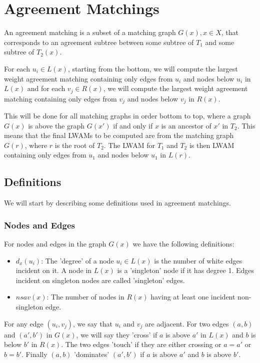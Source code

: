 \section{Agreement Matchings}
\label{agreementMatchingSection}
An agreement matching is a subset of a matching graph $G(x), x \in X$, that corresponds to an agreement subtree between some subtree of $T_1$ and some subtree of $T_2(x)$.

For each $u_i \in L(x)$, starting from the bottom, we will compute the largest weight agreement matching containing only edges from $u_i$ and nodes below $u_i$ in $L(x)$ and for each $v_j \in R(x)$, we will compute the largest weight agreement matching containing only edges from $v_j$ and nodes below $v_j$ in $R(x)$.

This will be done for all matching graphs in order bottom to top, where a graph $G(x)$ is above the graph $G(x')$ if and only if $x$ is an ancestor of $x'$ in $T_2$. This means that the final LWAMs to be computed are from the matching graph $G(r)$, where $r$ is the root of $T_2$. The LWAM for $T_1$ and $T_2$ is then LWAM containing only edges from $u_1$ and nodes below $u_1$ in $L(r)$.

\subsection{Definitions}
We will start by describing some definitions used in agreement matchings.

\subsubsection{Nodes and Edges}
For nodes and edges in the graph $G(x)$ we have the following definitions:
\begin{itemize}
	\item $d_x(u_i)$: The 'degree' of a node $u_i \in L(x)$ is the number of white edges incident on it.
	\subitem A node in $L(x)$ is a 'singleton' node if it has degree 1.
	\subitem Edges incident on singleton nodes are called 'singleton' edges.
	\item $nsav(x)$: The number of nodes in $R(x)$ having at least one incident non-singleton edge.
\end{itemize}

For any edge $(u_i, v_j)$, we say that $u_i$ and $v_j$ are adjacent. For two edges $(a,b)$ and $(a',b')$ in $G(x)$, we will say they 'cross' if $a$ is above $a'$ in $L(x)$ and $b$ is below $b'$ in $R(x)$. The two edges 'touch' if they are either crossing or $a=a'$ or $b=b'$. Finally $(a,b)$ 'dominates' $(a',b')$ if $a$ is above $a'$ and $b$ is above $b'$.

